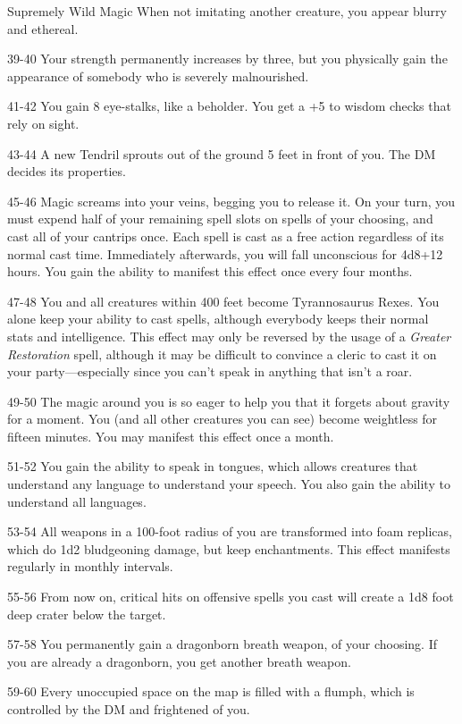 \begin{rolltable}{Supremely Wild Magic}
When not imitating another creature, you appear blurry and ethereal.
\item[39-40] Your strength permanently increases by three, but you physically gain the appearance of somebody who is severely malnourished.
\item[41-42] You gain 8 eye-stalks, like a beholder. You get a +5 to wisdom checks that rely on sight.
\item[43-44] A new Tendril sprouts out of the ground 5 feet in front of you. The DM decides its properties.
\item[45-46] Magic screams into your veins, begging you to release it.
On your turn, you must expend half of your remaining spell slots on spells of your choosing, and cast all of your cantrips once.
Each spell is cast as a free action regardless of its normal cast time.
Immediately afterwards, you will fall unconscious for 4d8+12 hours.
You gain the ability to manifest this effect once every four months.
\item[47-48] You and all creatures within 400 feet become Tyrannosaurus Rexes.
You alone keep your ability to cast spells, although everybody keeps their normal stats and intelligence.
This effect may only be reversed by the usage of a \textit{Greater Restoration} spell, although it may be difficult to convince a cleric to cast it on your party---especially since you can't speak in anything that isn't a roar.
\item[49-50] The magic around you is so eager to help you that it forgets about gravity for a moment.
You (and all other creatures you can see) become weightless for fifteen minutes.
You may manifest this effect once a month.
\item[51-52] You gain the ability to speak in tongues, which allows creatures that understand any language to understand your speech.
You also gain the ability to understand all languages.
\item[53-54] All weapons in a 100-foot radius of you are transformed into foam replicas, which do 1d2 bludgeoning damage, but keep enchantments.
This effect manifests regularly in monthly intervals.
\item[55-56] From now on, critical hits on offensive spells you cast will create a 1d8 foot deep crater below the target.
\item[57-58] You permanently gain a dragonborn breath weapon, of your choosing. If you are already a dragonborn, you get another breath weapon.
\item[59-60] Every unoccupied space on the map is filled with a flumph, which is controlled by the DM and frightened of you.

\end{rolltable}
